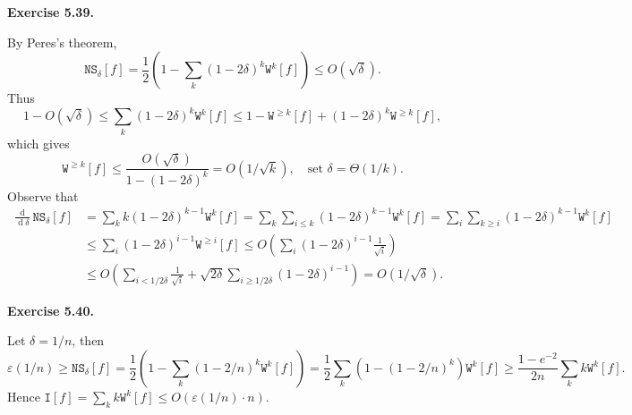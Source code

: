 \documentclass[a4paper]{article}
\newenvironment{exercise}[1]{
	\par
	\noindent\textbf{Exercise #1.}\quad
}{
	\par
	\bigskip
}
\DeclareMathOperator{\sd}{\mathop{d}}
\newcommand{\eps}{\varepsilon}
\newcommand{\pbra}[1]{{\left( #1 \right)}}
\newcommand{\Itt}{\mathtt{I}}
\newcommand{\Wtt}{\mathtt{W}}
\newcommand{\NS}{\mathtt{NS}}
\begin{document}
\begin{exercise}{5.39}
    By Peres's theorem, 
    $$
    \NS_\delta[f]=\frac12\pbra{1-\sum_k(1-2\delta)^k\Wtt^k[f]}\leq O(\sqrt\delta).
    $$
    Thus 
    $$
    1-O(\sqrt\delta)\leq\sum_k(1-2\delta)^k\Wtt^k[f]\leq1-\Wtt^{\geq k}[f]+(1-2\delta)^k\Wtt^{\geq k}[f],
    $$
    which gives
    $$
    \Wtt^{\geq k}[f]\leq\frac{O(\sqrt\delta)}{1-(1-2\delta)^k}=O(1/\sqrt k),\quad\text{set $\delta=\Theta(1/k)$}.
    $$
    Observe that
    \begin{align*}
    \frac{\sd}{\sd\delta}\NS_\delta[f]
        &=\sum_kk(1-2\delta)^{k-1}\Wtt^k[f]
        =\sum_k\sum_{i\leq k}(1-2\delta)^{k-1}\Wtt^k[f]
        =\sum_i\sum_{k\geq i}(1-2\delta)^{k-1}\Wtt^k[f]\\
        &\leq\sum_i(1-2\delta)^{i-1}\Wtt^{\geq i}[f]
        \leq O\pbra{\sum_i(1-2\delta)^{i-1}\frac1{\sqrt i}}\\
        &\leq O\pbra{\sum_{i<1/2\delta}\frac1{\sqrt i}+\sqrt{2\delta}\sum_{i\geq1/2\delta}(1-2\delta)^{i-1}}
        =O(1/\sqrt\delta).
    \end{align*}
\end{exercise}

\begin{exercise}{5.40}
    Let $\delta=1/n$, then
    $$
    \eps(1/n)\geq\NS_\delta[f]
    =\frac12\pbra{1-\sum_k(1-2/n)^k\Wtt^k[f]}
    =\frac12\sum_k\pbra{1-(1-2/n)^k}\Wtt^k[f]
    \geq\frac{1-e^{-2}}{2n}\sum_kk\Wtt^k[f].
    $$
    Hence $\Itt[f]=\sum_kk\Wtt^k[f]\leq O(\eps(1/n)\cdot n)$.
\end{exercise}
\end{document}
